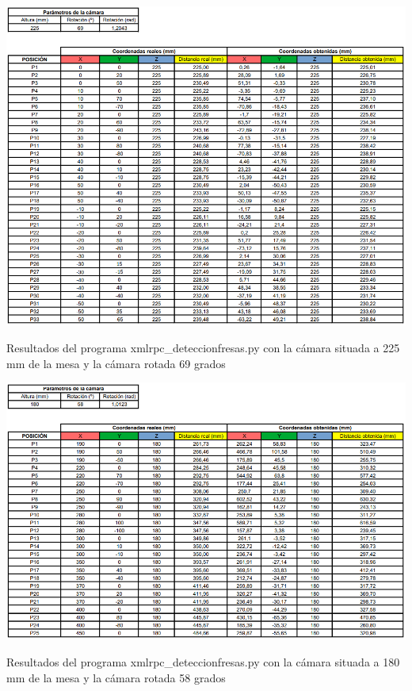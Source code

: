   \begin{table}[H]
     \centering
     \begin{center}
       \includegraphics[width=155mm]{figs/Resultados 225 mm 69 grados.png}
     \end{center}
     \caption{Resultados del programa xmlrpc\_deteccionfresas.py con la cámara situada a 225 mm de la mesa y la cámara rotada 69 grados}
     \label{tab:resultados_225mm_69grados}
  \end{table}  
  
  \begin{table}[H]
     \centering
     \begin{center}
       \includegraphics[width=155mm]{figs/Resultados 180 mm 58 grados.png}
     \end{center}
     \caption{Resultados del programa xmlrpc\_deteccionfresas.py con la cámara situada a 180 mm de la mesa y la cámara rotada 58 grados}
     \label{tab:resultados_180mm_58grados}
  \end{table}

